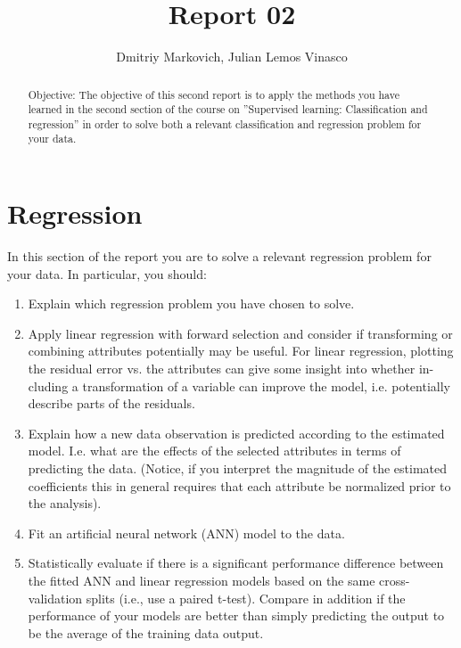 \documentclass[10pt, paper=a4]{article}
\begin{document}
\title{Report 02}

\author{ Dmitriy Markovich, Julian Lemos Vinasco}

\date{}

\maketitle

\begin{abstract}
  Objective: The objective of this second report is to apply the
  methods you have learned in the second section of the course on
  ”Supervised learning: Classification and regression” in order to
  solve both a relevant classification and regression problem for your
  data.
\end{abstract}

\section{Regression}
\label{sec:regression}
In this section of the report you are to solve a relevant regression
problem for your data. In particular, you should:
\begin{enumerate}
\item Explain which regression problem you have chosen to solve.
\item Apply linear regression with forward selection and consider if
  transforming or combining attributes potentially may be useful. For
  linear regression, plotting the residual error vs. the attributes
  can give some insight into whether in- cluding a transformation of a
  variable can improve the model, i.e. potentially describe parts of
  the residuals.
\item Explain how a new data observation is predicted according to the
  estimated model. I.e. what are the effects of the selected
  attributes in terms of predicting the data.  (Notice, if you
  interpret the magnitude of the estimated coefficients this in
  general requires that each attribute be normalized prior to the
  analysis).
\item Fit an artificial neural network (ANN) model to the data.
\item Statistically evaluate if there is a significant performance
  difference between the fitted ANN and linear regression models based
  on the same cross-validation splits (i.e., use a paired
  t-test). Compare in addition if the performance of your models are
  better than simply predicting the output to be the average of the
  training data output.
\end{enumerate}
\end{document}
